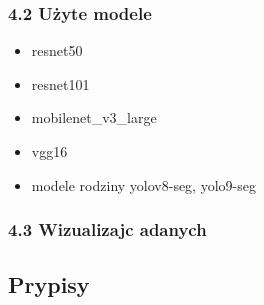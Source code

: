 \documentclass[
]{article}
\providecommand{\tightlist}{%
  \setlength{\itemsep}{0pt}\setlength{\parskip}{0pt}}
\begin{document}
\subsubsection{4.2 Użyte modele}\label{uux17cyte-modele}

\begin{itemize}
\tightlist
\item
  resnet50
\item
  resnet101
\item
  mobilenet\_v3\_large
\item
  vgg16
\item
  modele rodziny yolov8-seg, yolo9-seg
\end{itemize}

\subsubsection{4.3 Wizualizajc adanych}\label{wizualizajc-adanych}

\subsection{Prypisy}\label{prypisy}
\end{document}
